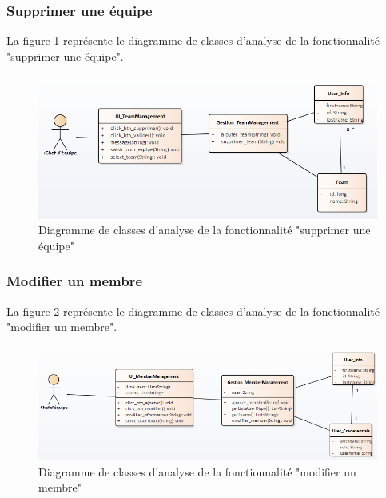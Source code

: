 \subsubsection{Supprimer une équipe}
La figure \ref{code65} représente le diagramme de classes d'analyse de la fonctionnalité "supprimer une équipe".
\begin{figure}[H]
  \centering
 \includegraphics[scale=0.69]{figures/diagrams/class/deleteteam_class_diag.png}
 \caption{Diagramme de classes d'analyse de la fonctionnalité "supprimer une équipe"}
 \label{code65}
\end{figure}

\subsubsection{Modifier un membre}
La figure \ref{code66} représente le diagramme de classes d'analyse de la fonctionnalité "modifier un membre".
\begin{figure}[H]
  \centering
 \includegraphics[scale=0.69]{figures/diagrams/class/updatemember_class_diag.png}
 \caption{Diagramme de classes d'analyse de la fonctionnalité "modifier un membre"}
 \label{code66}
\end{figure}

